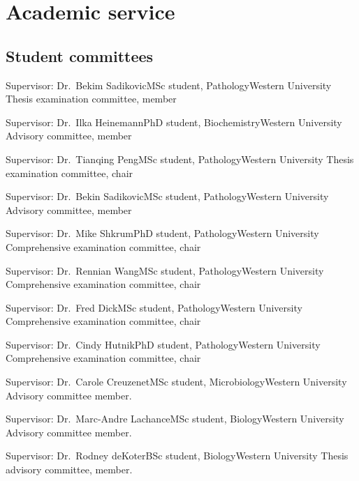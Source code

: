 \section {Academic service}


\subsection {Student committees}


{Supervisor: Dr.~Bekim Sadikovic}{MSc student, Pathology}{Western University}
{Thesis examination committee, member}

{Supervisor: Dr.~Ilka Heinemann}{PhD student, Biochemistry}{Western University}
{Advisory committee, member}

{Supervisor: Dr.~Tianqing Peng}{MSc student, Pathology}{Western University}
{Thesis examination committee, chair}

{Supervisor: Dr.~Bekin Sadikovic}{MSc student, Pathology}{Western University}
{Advisory committee, member}

{Supervisor: Dr.~Mike Shkrum}{PhD student, Pathology}{Western University}
{Comprehensive examination committee, chair}

{Supervisor: Dr.~Rennian Wang}{MSc student, Pathology}{Western University}
{Comprehensive examination committee, chair}

{Supervisor: Dr.~Fred Dick}{MSc student, Pathology}{Western University}
{Comprehensive examination committee, chair}

{Supervisor: Dr.~Cindy Hutnik}{PhD student, Pathology}{Western University}
{Comprehensive examination committee, chair}

{Supervisor: Dr.~Carole Creuzenet}{MSc student, Microbiology}{Western University}
{Advisory committee member.}

{Supervisor: Dr.~Marc-Andre Lachance}{MSc student, Biology}{Western University}
{Advisory committee member.}

{Supervisor: Dr.~Rodney deKoter}{BSc student, Biology}{Western University}
{Thesis advisory committee, member.}

